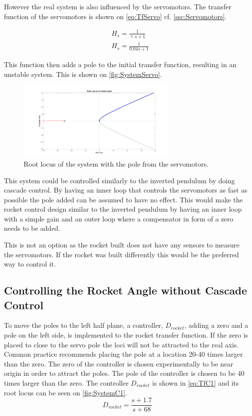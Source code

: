 However the real system is also influenced by the servomotors. The transfer function of the servomotors is shown on \autoref{eq:TfServo} cf. \autoref{ssc:Servomotors}. 

\begin{subequations}
	\begin{flalign}
& H_s = \frac{1}{\uptau s+ 1}	\\
& H_s = \frac{1}{0.04s + 1}
\label{eq:TfServo}
	\end{flalign}
\end{subequations}
\startexplain
{}
\stopexplain

This function then adds a pole to the initial transfer function, resulting in an unstable system. This is shown on \autoref{fig:SystemServo}.
\begin{figure}[htbp]
\centering
\includegraphics[width=0.7\textwidth]{figures/Rocket/design/tf_with_servo_vf}
\caption{Root locus of the system with the pole from the servomotors.}
\label{fig:SystemServo}
\end{figure}

This system could be controlled similarly to the inverted pendulum by doing cascade control. By having an inner loop that controls the servomotors as fast as possible the pole added can be assumed to have no effect. This would make the rocket control design similar to the inverted pendulum by having an inner loop with a simple gain and an outer loop where a compensator in form of a zero needs to be added. 

This is not an option as the rocket built does not have any sensors to measure the servomotors. If the rocket was built differently this would be the preferred way to control it.

\subsection{Controlling the Rocket Angle without Cascade Control}
To move the poles to the left half plane, a controller, $D_{rocket}$, adding a zero and a pole on the left side, is implemented to the rocket transfer function. If the zero is placed to close to the servo pole the loci will not be attracted to the real axis. Common practice recommends placing the pole at a location 20-40 times larger than the zero. The zero of the controller is chosen experimentally to be near origin in order to attract the poles. The pole of the controller is chosen to be 40 times larger than the zero. The controller $D_{rocket}$ is shown in \autoref{eq:TfC1} and its root locus can be seen on \autoref{fig:SystemC1}.
\begin{equation}
D_{rocket} = \frac{s + 1.7}{s + 68}	\label{eq:TfC1}
\end{equation}

